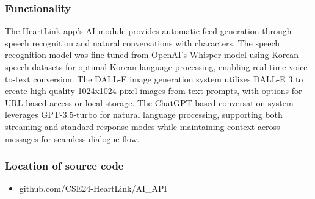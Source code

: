 \documentclass[conference]{IEEEtran}
\begin{document}
        \subsubsection{Functionality}
            The HeartLink app's AI module provides automatic feed generation through speech recognition and natural conversations with characters. The speech recognition model was fine-tuned from OpenAI's Whisper model using Korean speech datasets for optimal Korean language processing, enabling real-time voice-to-text conversion. The DALL-E image generation system utilizes DALL-E 3 to create high-quality 1024x1024 pixel images from text prompts, with options for URL-based access or local storage. The ChatGPT-based conversation system leverages GPT-3.5-turbo for natural language processing, supporting both streaming and standard response modes while maintaining context across messages for seamless dialogue flow.\\
            \vspace{3mm}
        \subsubsection{Location of source code}
            \begin{itemize}
                \item github.com/CSE24-HeartLink/AI\_API
            \end{itemize}
\end{document}
